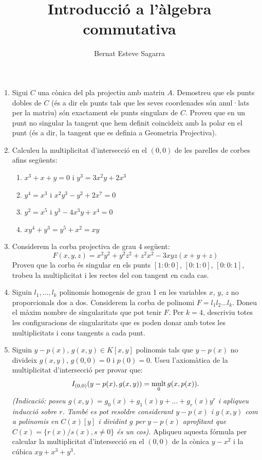 \documentclass[11pt, a4paper]{article}
\title{Introducció a l'àlgebra commutativa}
\author{Bernat Esteve Sagarra}
\begin{document}
\pagestyle{fancy}
% 
\begin{tcolorbox}[title=\section{Lab 1}]
    \begin{enumerate}
        \item[\textbf{P1}] Sigui $C$ una cònica del pla projectiu amb matriu $A$. Demostreu que els punts dobles de $C$ (és         a dir els punts tals que les seves coordenades són anul·lats per la matriu) són exactament els punts singulars de $C$. Proveu que en un punt no singular la tangent que hem definit coincideix amb la polar en el punt (és a dir, la tangent que es definia a Geometria Projectiva).
        \item[\textbf{P2}] Calculeu la multiplicitat d'intersecció en el $(0, 0)$ de les parelles de corbes afins següents:
        \begin{enumerate}
            \item $x^3+x+y=0$ i $y^3 = 3x^2y+2x^3$
            \item $y^4 = x^3$ i $x^2y^3 - y^2+2x^7 = 0$
            \item $y^2 = x^5$ i $y^3 - 4x^3y+x^4 = 0$
            \item $xy^4+y^3 = y^5+x^2 = xy$
        \end{enumerate}
        \item[\textbf{P3}] Considerem la corba projectiva de grau 4 següent:
        \[
            F(x, y, z) = x^2y^2+y^2z^2+z^2x^2-3xyz(x+y+z)
        \]
        Proveu que la corba és singular en els punts $[1 : 0 : 0]$, $[0 : 1 : 0]$, $[0 : 0 : 1]$, trobeu la multiplicitat i les rectes del con tangent en cada cas.
        \item[\textbf{P4}] Siguin $l_1, \dots , l_k$ polinomis homogenis de grau 1 en les variables $x$, $y$, $z$ no proporcionals dos a dos. Considerem la corba de polinomi $F = l_1l_2 \dots l_k$. Doneu el màxim nombre de singularitats que pot tenir $F$. Per $k = 4$, descriviu totes les configuracions de singularitats que es poden donar amb totes les multiplicitats i cons tangents a cada punt.
        \item[\textbf{P5}] Siguin $y - p(x)$, $g(x, y) \in K[x, y]$ polinomis tals que $y - p(x)$ no divideix $g(x, y)$, $g(0, 0) = 0$ i $p(0) = 0$. Useu l'axiomàtica de la multiplicitat d'intersecció per provar que:
        \[I_{(0,0)}(y - p(x), g(x, y)) = \operatorname*{mult}_0 g(x, p(x)).\]
        \textit{(Indicació: poseu $g(x, y) = g_0(x) + g_1(x)y + \dots + g_r(x)y^r$ i apliqueu inducció sobre $r$. També es pot resoldre considerant $y - p(x)$ i $g(x, y)$ com a polinomis en $C(x)[y]$ i dividint $g$ per $y - p(x)$ aprofitant que $C(x) = \{r(x)/s(x), s\neq 0\}$ és un cos).}
        Apliqueu aquesta fórmula per calcular la multiplicitat d'intersecció en el $(0, 0)$ de la cònica $y - x^2$ i la cúbica $xy + x^3+y^3$.
    \end{enumerate}
\end{tcolorbox}
\end{document}
